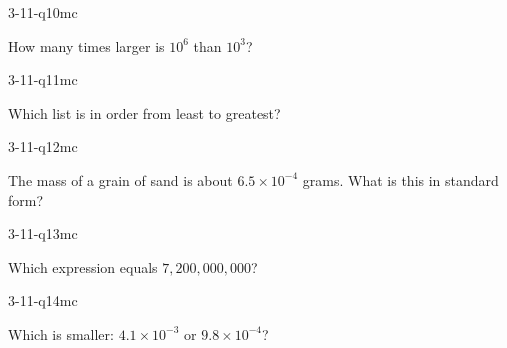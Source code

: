 \begin{practiceQuestion}{3-11-q10}{mc}
\begin{questionText}
How many times larger is $10^6$ than $10^3$?
\end{questionText}
\end{practiceQuestion}

\begin{practiceQuestion}{3-11-q11}{mc}
\begin{questionText}
Which list is in order from least to greatest?
\end{questionText}
\end{practiceQuestion}

\begin{practiceQuestion}{3-11-q12}{mc}
\begin{questionText}
The mass of a grain of sand is about $6.5 \times 10^{-4}$ grams. What is this in standard form?
\end{questionText}
\end{practiceQuestion}

\begin{practiceQuestion}{3-11-q13}{mc}
\begin{questionText}
Which expression equals $7{,}200{,}000{,}000$?
\end{questionText}
\end{practiceQuestion}

\begin{practiceQuestion}{3-11-q14}{mc}
\begin{questionText}
Which is smaller: $4.1 \times 10^{-3}$ or $9.8 \times 10^{-4}$?
\end{questionText}
\end{practiceQuestion}

